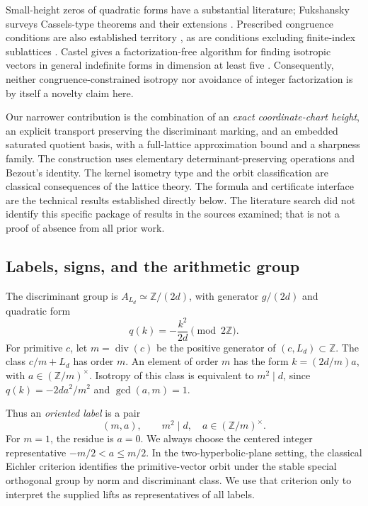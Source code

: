 \documentclass[11pt]{article}
\theoremstyle{remark}\newtheorem{remark}[theorem]{Remark}
\newcommand{\Z}{\mathbb Z}\newcommand{\Q}{\mathbb Q}\newcommand{\R}{\mathbb R}
\newcommand{\divis}{\operatorname{div}}\newcommand{\SL}{\operatorname{SL}}\newcommand{\htv}{\operatorname{ht}}
\begin{document}
Small-height zeros of quadratic forms have a substantial literature; Fukshansky surveys Cassels-type theorems and their extensions \cite{fuk}. Prescribed congruence conditions are also established territory \cite{bg}, as are conditions excluding finite-index sublattices \cite{fj}. Castel gives a factorization-free algorithm for finding isotropic vectors in general indefinite forms in dimension at least five \cite{castel}. Consequently, neither congruence-constrained isotropy nor avoidance of integer factorization is by itself a novelty claim here.

Our narrower contribution is the combination of an \emph{exact coordinate-chart height}, an explicit transport preserving the discriminant marking, and an embedded saturated quotient basis, with a full-lattice approximation bound and a sharpness family. The construction uses elementary determinant-preserving operations and Bezout's identity. The kernel isometry type and the orbit classification are classical consequences of the lattice theory. The formula and certificate interface are the technical results established directly below. The literature search did not identify this specific package of results in the sources examined; that is not a proof of absence from all prior work.

\subsection{Labels, signs, and the arithmetic group}
The discriminant group is $A_{L_d}\simeq\Z/(2d)$, with generator $g/(2d)$ and quadratic form
\begin{equation}\label{eq:disc}
 q(k)=-\frac{k^2}{2d}\pmod{2\Z}.
\end{equation}
For primitive $c$, let $m=\divis(c)$ be the positive generator of $(c,L_d)\subset\Z$. The class $c/m+L_d$ has order $m$. An element of order $m$ has the form $k=(2d/m)a$, with $a\in(\Z/m)^\times$. Isotropy of this class is equivalent to $m^2\mid d$, since $q(k)=-2da^2/m^2$ and $\gcd(a,m)=1$.

Thus an \emph{oriented label} is a pair
\begin{equation}\label{eq:label}
 (m,a),\qquad m^2\mid d,\quad a\in(\Z/m)^\times.
\end{equation}
For $m=1$, the residue is $a=0$. We always choose the centered integer representative $-m/2<a\leq m/2$. In the two-hyperbolic-plane setting, the classical Eichler criterion identifies the primitive-vector orbit under the stable special orthogonal group by norm and discriminant class. We use that criterion only to interpret the supplied lifts as representatives of all labels.
\end{document}
